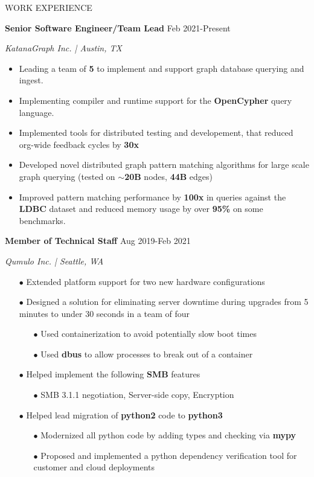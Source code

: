 \documentclass[paper=a4,fontsize=11pt]{scrartcl} %
\newcommand{\sepspace}{\vspace*{1em}}		%
\newcommand{\NewPart}[1]{ \noindent \large \usefont{OT1}{phv}{b}{n}\uppercase{#1} \normalfont \normalsize}
\newcommand{\EducationEntry}[4]{
		\noindent \textbf{#1}     %
			\hfill#2 \par  %
		\noindent \textit{#3} \par        %
		\noindent\hangafter=0 \small #4 %
		\normalsize \par}
\begin{document}
\hspace{-1.5em}
\begin{minipage}[t]{0.78\textwidth}
\sepspace

\vspace{-1.5em}
\NewPart{Work experience}{}

\EducationEntry{Senior Software Engineer/Team Lead}{Feb 2021-Present}{KatanaGraph Inc. | Austin, TX}{
\begin{itemize}
  \item Leading a team of \textbf{5} to implement and support graph database querying and ingest.
  \item Implementing compiler and runtime support for the \textbf{OpenCypher} query language.
  \item Implemented tools for distributed testing and developement, that reduced org-wide feedback cycles by \textbf{30x}
  \item Developed novel distributed graph pattern matching algorithms for large scale graph querying (tested on $\sim$\textbf{20B} nodes, \textbf{44B} edges)
  \item Improved pattern matching performance by \textbf{100x} in queries against the \textbf{LDBC} dataset and reduced memory usage by over \textbf{95\%} on some benchmarks.
\end{itemize}
}

\EducationEntry{Member of Technical Staff}{Aug 2019-Feb 2021}{Qumulo Inc. | Seattle, WA}{
\begin{itemize}
  \item[$\bullet$] Extended platform support for two new hardware configurations
  \item[$\bullet$] Designed a solution for eliminating server downtime during upgrades from 5 minutes to under 30 seconds in a team of four
    \begin{itemize}
        \item[$\bullet$] Used containerization to avoid potentially slow boot times
        \item[$\bullet$] Used \textbf{dbus} to allow processes to break out of a container
    \end{itemize}
  \item[$\bullet$] Helped implement the following \textbf{SMB} features
    \begin{itemize}
      \item[$\bullet$] SMB 3.1.1 negotiation, Server-side copy, Encryption
    \end{itemize}
  \item[$\bullet$] Helped lead migration of \textbf{python2} code to \textbf{python3}
    \begin{itemize}
      \item[$\bullet$] Modernized all python code by adding types and checking via \textbf{mypy}
      \item[$\bullet$] Proposed and implemented a python dependency verification tool for customer and cloud deployments
    \end{itemize}
\end{itemize}
}


\end{minipage}
\end{document}
